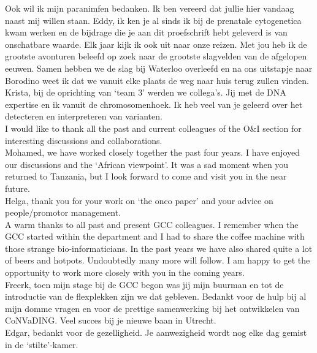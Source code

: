 \begin{appendices}
	\noindent Ook wil ik mijn paranimfen bedanken. Ik ben vereerd dat jullie hier vandaag naast mij willen staan. Eddy, ik ken je al sinds ik bij de prenatale cytogenetica kwam werken en de bijdrage die je aan dit proefschrift hebt geleverd is van onschatbare waarde. Elk jaar kijk ik ook uit naar onze reizen. Met jou heb ik de grootste avonturen beleefd op zoek naar de grootste slagvelden van de afgelopen eeuwen. Samen hebben we de slag bij Waterloo overleefd en na ons uitstapje naar Borodino weet ik dat we vanuit elke plaats de weg naar huis terug zullen vinden. Krista, bij de oprichting van ‘team 3’ werden we collega’s. Jij met de DNA expertise en ik vanuit de chromosomenhoek. Ik heb veel van je geleerd over het detecteren en interpreteren van varianten.\\ 
	
	\noindent I would like to thank all the past and current colleagues of the O\&I section for interesting discussions and collaborations.\\ 
	
	\noindent Mohamed, we have worked closely together the past four years. I have enjoyed our discussions and the ‘African viewpoint’. It was a sad moment when you returned to Tanzania, but I look forward to come and visit you in the near future.\\
	
	\noindent Helga, thank you for your work on ‘the onco paper’ and your advice on people/promotor management.\\
	
	\noindent A warm thanks to all past and present GCC colleagues. I remember when the GCC started within the department and I had to share the coffee machine with those strange bio-informaticians. In the past years we have also shared quite a lot of beers and hotpots. Undoubtedly many more will follow. I am happy to get the opportunity to work more closely with you in the coming years.\\
	
	\noindent Freerk, toen mijn stage bij de GCC begon was jij mijn buurman en tot de introductie van de flexplekken zijn we dat gebleven. Bedankt voor de hulp bij al mijn domme vragen en voor de prettige samenwerking bij het ontwikkelen van CoNVaDING. Veel succes bij je nieuwe baan in Utrecht.\\
	
	\noindent Edgar, bedankt voor de gezelligheid. Je aanwezigheid wordt nog elke dag gemist in de ‘stilte’-kamer.\\
	

\end{appendices}

